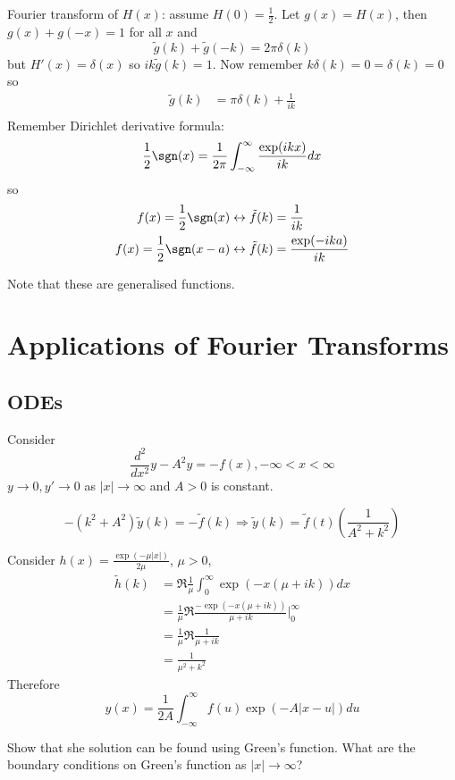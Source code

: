 \documentclass[a4paper]{article}
\newcommand*{\ft}{\tilde}
\begin{document}
Fourier transform of \(H(x)\): assume \(H(0) = \frac{1}{2}\). Let \(g(x) = H(x)\), then \(g(x) + g(-x) = 1\) for all \(x\) and
  \[
    \ft g(k) + \ft g(-k) = 2\pi \delta(k)
  \]
  but \(H'(x) = \delta(x)\) so \(ik \ft g(k) = 1\). Now remember \(k \delta(k) = 0 = \delta(k) = 0\) so
  \begin{align*}
    \ft g(k) &= \pi \delta(k) + \frac{1}{ik} \\
  \end{align*}
  Remember Dirichlet derivative formula:
  \[
    \frac{1}{2} \sgn(x) = \frac{1}{2\pi} \int_{-\infty}^{\infty} \frac{\exp(ikx)}{ik} dx
  \]
  so
  \begin{align*}
    f(x) = \frac{1}{2} \sgn(x) &\leftrightarrow \ft f(k) = \frac{1}{ik} \\
    f(x) = \frac{1}{2} \sgn(x - a) &\leftrightarrow \ft f(k) = \frac{\exp(-ika)}{ik}
  \end{align*}

  Note that these are generalised functions.

  \section{Applications of Fourier Transforms}

\subsection{ODEs}

Consider
\[
  \frac{d^2}{dx^2}y - A^2 y = - f(x), -\infty < x < \infty
\]
\(y \to 0, y' \to 0\) as \(|x| \to \infty\) and \(A > 0\) is constant.

\[
  -(k^2 + A^2) \ft y(k) = -\ft f(k) \Rightarrow \ft y(k) = \ft f(t) \left( \frac{1}{A^2 + k^2} \right)
\]

Consider \(h(x) = \frac{\exp(-\mu |x|)}{2\mu}\), \(\mu > 0\),
\begin{align*}
  \ft h(k) &= \Re \frac{1}{\mu} \int_{0}^{\infty} \exp(-x(\mu + ik)) dx \\
           &= \frac{1}{\mu} \Re \frac{-\exp(-x(\mu + ik))}{\mu + ik} \Big|_0^\infty \\
           &= \frac{1}{\mu} \Re \frac{1}{\mu + ik} \\
           &= \frac{1}{\mu^2 + k^2}
\end{align*}
Therefore
\[
  y(x) = \frac{1}{2A} \int_{-\infty}^{\infty} f(u) \exp(-A |x - u|) du
\]

\begin{ex}
  Show that she solution can be found using Green's function. What are the boundary conditions on Green's function as \(|x| \to \infty\)?
\end{ex}
\end{document}
